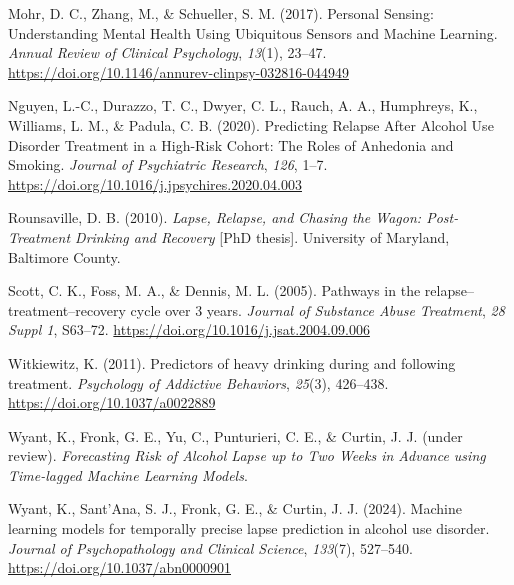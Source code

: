 \documentclass[
  letterpaper,
  DIV=11,
  numbers=noendperiod]{scrartcl}
\newlength{\cslhangindent}
\newenvironment{CSLReferences}[2] %
 {\begin{list}{}{%
  \setlength{\itemindent}{0pt}
  \setlength{\leftmargin}{0pt}
  \setlength{\parsep}{0pt}
  \ifodd #1
   \setlength{\leftmargin}{\cslhangindent}
   \setlength{\itemindent}{-1\cslhangindent}
  \fi
  \setlength{\itemsep}{#2\baselineskip}}}
 {\end{list}}
\begin{document}
\begin{CSLReferences}{1}{0}
Mohr, D. C., Zhang, M., \& Schueller, S. M. (2017). Personal {Sensing}:
{Understanding Mental Health Using Ubiquitous Sensors} and {Machine
Learning}. \emph{Annual Review of Clinical Psychology}, \emph{13}(1),
23--47. \url{https://doi.org/10.1146/annurev-clinpsy-032816-044949}

Nguyen, L.-C., Durazzo, T. C., Dwyer, C. L., Rauch, A. A., Humphreys,
K., Williams, L. M., \& Padula, C. B. (2020). Predicting {Relapse After
Alcohol Use Disorder Treatment} in a {High-Risk Cohort}: {The Roles} of
{Anhedonia} and {Smoking}. \emph{Journal of Psychiatric Research},
\emph{126}, 1--7. \url{https://doi.org/10.1016/j.jpsychires.2020.04.003}

Rounsaville, D. B. (2010). \emph{Lapse, {Relapse}, and {Chasing} the
{Wagon}: {Post-Treatment Drinking} and {Recovery}} {[}PhD thesis{]}.
University of Maryland, Baltimore County.

Scott, C. K., Foss, M. A., \& Dennis, M. L. (2005). Pathways in the
relapse--treatment--recovery cycle over 3 years. \emph{Journal of
Substance Abuse Treatment}, \emph{28 Suppl 1}, S63--72.
\url{https://doi.org/10.1016/j.jsat.2004.09.006}

Witkiewitz, K. (2011). Predictors of heavy drinking during and following
treatment. \emph{Psychology of Addictive Behaviors}, \emph{25}(3),
426--438. \url{https://doi.org/10.1037/a0022889}

Wyant, K., Fronk, G. E., Yu, C., Punturieri, C. E., \& Curtin, J. J.
(under review). \emph{Forecasting {Risk} of {Alcohol Lapse} up to {Two
Weeks} in {Advance} using {Time-lagged Machine Learning Models}}.

Wyant, K., Sant'Ana, S. J., Fronk, G. E., \& Curtin, J. J. (2024).
Machine learning models for temporally precise lapse prediction in
alcohol use disorder. \emph{Journal of Psychopathology and Clinical
Science}, \emph{133}(7), 527--540.
\url{https://doi.org/10.1037/abn0000901}

\end{CSLReferences}
\end{document}
